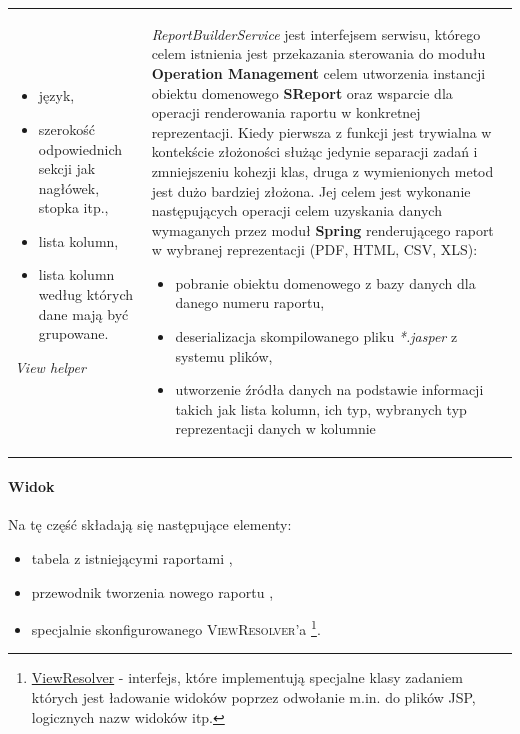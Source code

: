 \begin{center}
\begin{longtable}{| p{2.5cm} | p{13cm} |}
\begin{itemize}
						\item język,
						\item szerokość odpowiednich sekcji jak nagłówek, stopka itp.,
						\item lista kolumn,
						\item lista kolumn według których dane mają być grupowane.
					\end{itemize}
					\hline
					\emph{View helper}												&
					\emph{ReportBuilderService} jest interfejsem serwisu, którego celem istnienia jest przekazania sterowania do modułu
					\textbf{Operation Management} celem utworzenia instancji obiektu domenowego \textbf{SReport} oraz wsparcie
					dla operacji renderowania raportu w konkretnej reprezentacji. Kiedy pierwsza z funkcji jest trywialna w kontekście złożoności służąc
					jedynie separacji zadań i zmniejszeniu kohezji klas, druga z wymienionych metod jest dużo bardziej złożona.
					Jej celem jest wykonanie następujących operacji celem uzyskania danych wymaganych przez moduł \textbf{Spring} renderującego
					raport w wybranej reprezentacji (PDF, HTML, CSV, XLS):
					\begin{itemize}
						\item pobranie obiektu domenowego z bazy danych dla danego numeru raportu, 
						\item deserializacja skompilowanego pliku \textit{*.jasper} z systemu plików,
						\item utworzenie źródła danych na podstawie informacji takich jak lista kolumn, ich typ, wybranych typ reprezentacji danych w kolumnie
					\end{itemize}
					\hline
				\end{longtable}
				\label{app:rbuilder_services_functionality_table}
			\end{center}
						 
			\paragraph{Widok}
			Na tę część składają się następujące elementy:
			\begin{itemize}
				\item tabela z istniejącymi raportami \label{app:rbuilder_table},
				\item przewodnik tworzenia nowego raportu \label{app:rbuilder_wizard},
				\item specjalnie skonfigurowanego \textsc{ViewResolver}'a \footnote{\href{http://docs.spring.io/spring/docs/current/javadoc-api/org/springframework/web/servlet/ViewResolver.html}{ViewResolver} - interfejs, które implementują specjalne klasy zadaniem których jest ładowanie widoków poprzez odwołanie m.in. do plików JSP, logicznych nazw widoków itp.}.
			\end{itemize}

